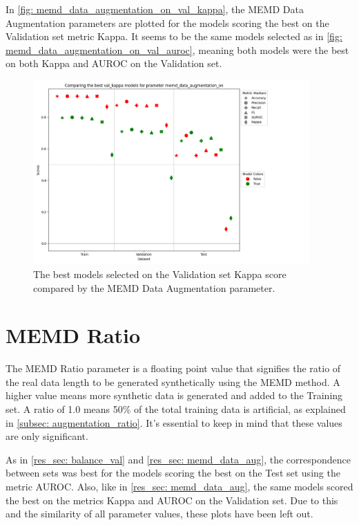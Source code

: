 In \autoref{fig: memd_data_augmentation_on_val_kappa}, the MEMD Data Augmentation parameters are plotted for the models scoring the best on the Validation set metric Kappa. It seems to be the same models selected as in \autoref{fig: memd_data_augmentation_on_val_auroc}, meaning both models were the best on both Kappa and AUROC on the Validation set.

\begin{figure}[H]
    \centering
    \includegraphics[width=400px]{Figures/results/memd_data_augmentation_on/memd_data_augmentation_on_val_kappa.png}
    \caption{The best models selected on the Validation set Kappa score compared by the MEMD Data Augmentation parameter.}
    \label{fig: memd_data_augmentation_on_val_kappa}
\end{figure}


\section{MEMD Ratio}
\label{res_sec: memd_ratio}
The MEMD Ratio parameter is a floating point value that signifies the ratio of the real data length to be generated synthetically using the MEMD method. A higher value means more synthetic data is generated and added to the Training set. A ratio of 1.0 means 50\% of the total training data is artificial, as explained in \autoref{subsec: augmentation_ratio}. It's essential to keep in mind that these values are only significant. 

As in \autoref{res_sec: balance_val} and \autoref{res_sec: memd_data_aug}, the correspondence between sets was best for the models scoring the best on the Test set using the metric AUROC. Also, like in \autoref{res_sec: memd_data_aug}, the same models scored the best on the metrics Kappa and AUROC on the Validation set. Due to this and the similarity of all parameter values, these plots have been left out.

